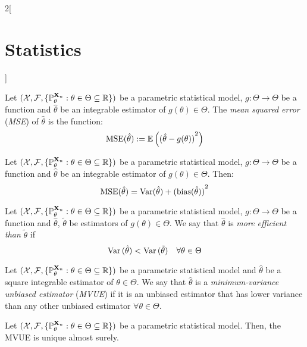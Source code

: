 \documentclass[../../../main.tex]{subfiles}
\begin{document}
\begin{multicols}{2}[\section{Statistics}]
\begin{definition}
    Let $(\mathcal{X},\mathcal{F},\{\mathbb{P}_{\theta}^{\boldsymbol{\mathrm{X}}_n}:{\theta}\in\Theta\subseteq \mathbb{R}\})$ be a parametric statistical model, $g:\Theta\rightarrow\Theta$ be a function and ${\hat\theta}$ be an integrable estimator of $g({\theta})\in\Theta$. The \emph{mean squared error} (\emph{MSE}) of ${\hat\theta}$ is the function: $$\operatorname{MSE}({\hat\theta}):=\mathbb{E}\left({({\hat\theta}-g({\theta}))}^2\right)$$
  \end{definition}
  \begin{proposition}
    Let $(\mathcal{X},\mathcal{F},\{\mathbb{P}_{\theta}^{\boldsymbol{\mathrm{X}}_n}:{\theta}\in\Theta\subseteq \mathbb{R}\})$ be a parametric statistical model, $g:\Theta\rightarrow\Theta$ be a function and ${\hat\theta}$ be an integrable estimator of $g({\theta})\in\Theta$. Then: $$\operatorname{MSE}({\hat\theta})=\operatorname{Var}({\hat\theta})+{(\operatorname{bias}({\hat\theta}))}^2$$
  \end{proposition}
  \begin{definition}
    Let $(\mathcal{X},\mathcal{F},\{\mathbb{P}_{\theta}^{\boldsymbol{\mathrm{X}}_n}:{\theta}\in\Theta\subseteq \mathbb{R}\})$ be a parametric statistical model, $g:\Theta\rightarrow\Theta$ be a function and ${\hat\theta}$, ${\tilde\theta}$ be estimators of $g({\theta})\in\Theta$. We say that ${\hat\theta}$ is \emph{more efficient than} ${\tilde\theta}$ if $$\operatorname{Var}{({\hat\theta})}<\operatorname{Var}{({\tilde\theta})}\quad\forall{\theta}\in\Theta$$
  \end{definition}
  \begin{definition}
    Let $(\mathcal{X},\mathcal{F},\{\mathbb{P}_{\theta}^{\boldsymbol{\mathrm{X}}_n}:{\theta}\in\Theta\subseteq \mathbb{R}\})$ be a parametric statistical model and ${\hat\theta}$ be a square integrable estimator of ${\theta}\in\Theta$. We say that ${\hat\theta}$ is a \emph{minimum-variance unbiased estimator} (\emph{MVUE}) if it is an unbiased estimator that has lower variance than any other unbiased estimator $\forall {\theta}\in\Theta$.
  \end{definition}
  \begin{proposition}
    Let $(\mathcal{X},\mathcal{F},\{\mathbb{P}_{\theta}^{\boldsymbol{\mathrm{X}}_n}:{\theta}\in\Theta\subseteq \mathbb{R}\})$ be a parametric statistical model. Then, the MVUE is unique almost surely.
  \end{proposition}

\end{multicols}
\end{document}
